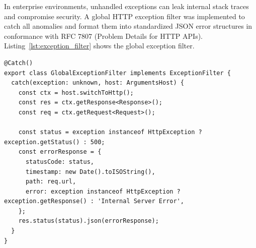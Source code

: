 In enterprise environments, unhandled exceptions can leak internal stack traces and compromise security. A global HTTP exception filter was implemented to catch all anomalies and format them into standardized JSON error structures in conformance with RFC 7807 (Problem Details for HTTP APIs). Listing~\ref{lst:exception_filter} shows the global exception filter.

\begin{lstlisting}[caption={Global Centralized HTTP Exception Filter.}, label={lst:exception_filter}]
@Catch()
export class GlobalExceptionFilter implements ExceptionFilter {
  catch(exception: unknown, host: ArgumentsHost) {
    const ctx = host.switchToHttp();
    const res = ctx.getResponse<Response>();
    const req = ctx.getRequest<Request>();

    const status = exception instanceof HttpException ? exception.getStatus() : 500;
    const errorResponse = {
      statusCode: status,
      timestamp: new Date().toISOString(),
      path: req.url,
      error: exception instanceof HttpException ? exception.getResponse() : 'Internal Server Error',
    };
    res.status(status).json(errorResponse);
  }
}
\end{lstlisting}
